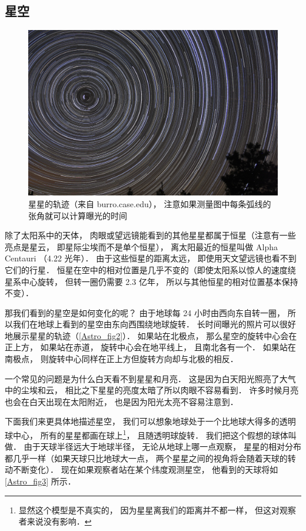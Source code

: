 \subsection{星空}

\begin{figure}[ht]
\centering
\includegraphics[width=14cm]{./figures/Astro2.png}
\caption{星星的轨迹（来自 burro.case.edu）， 注意如果测量图中每条弧线的张角就可以计算曝光的时间} \label{Astro_fig2}
\end{figure}

除了太阳系中的天体， 肉眼或望远镜能看到的其他星星都属于恒星（注意有一些亮点是星云， 即星际尘埃而不是单个恒星）， 离太阳最近的恒星叫做 Alpha Centauri （4.22 光年）． 由于这些恒星的距离太远， 即使用天文望远镜也看不到它们的行星． 恒星在空中的相对位置是几乎不变的（即使太阳系以惊人的速度绕星系中心旋转， 但转一圈仍需要 2.3 亿年， 所以与其他恒星的相对位置基本保持不变）．

那我们看到的星空是如何变化的呢？ 由于地球每 24 小时由西向东自转一圈， 所以我们在地球上看到的星空由东向西围绕地球旋转． 长时间曝光的照片可以很好地展示星星的轨迹（\autoref{Astro_fig2}）． 如果站在北极点， 那么星空的旋转中心会在正上方， 如果站在赤道， 旋转中心会在地平线上， 且南北各有一个． 如果站在南极点， 则旋转中心同样在正上方但旋转方向却与北极的相反．

一个常见的问题是为什么白天看不到星星和月亮． 这是因为白天阳光照亮了大气中的尘埃和云， 相比之下星星的亮度太暗了所以肉眼不容易看到． 许多时候月亮也会在白天出现在太阳附近， 也是因为阳光太亮不容易注意到．

下面我们来更具体地描述星空， 我们可以想象地球处于一个比地球大得多的透明球中心， 所有的星星都画在球上\footnote{显然这个模型是不真实的， 因为星星离我们的距离并不都一样， 但这对观察者来说没有影响．}， 且随透明球旋转． 我们把这个假想的球体叫做． 由于天球半径远大于地球半径， 无论从地球上哪一点观察， 星星的相对分布都几乎一样（如果天球只比地球大一点， 两个星星之间的视角将会随着天球的转动不断变化）． 现在如果观察者站在某个纬度观测星空， 他看到的天球将如\autoref{Astro_fig3} 所示．

